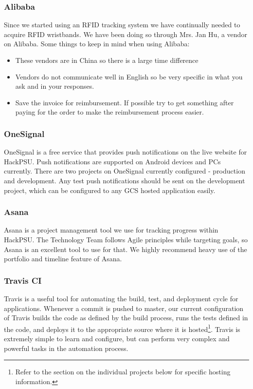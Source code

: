 \documentclass[twoside, 12pt]{article}
\newenvironment{tightitemize} %
{\begin{itemize}\itemsep1pt \parskip0pt \parsep0pt}
{\end{itemize}\vspace{-\topsep}}
\begin{document}
\subsubsection{Alibaba} \label{section:alibaba}
\par Since we started using an RFID tracking system we have continually needed to acquire RFID wristbands.  We have been doing so through Mrs. Jan Hu, a vendor on Alibaba.  Some things to keep in mind when using Alibaba:
\begin{tightitemize}
    \item These vendors are in China so there is a large time difference
    \item Vendors do not communicate well in English so be very specific in what you ask and in your responses.
    \item Save the invoice for reimbursement.  If possible try to get something after paying for the order to make the reimbursement process easier.
\end{tightitemize}

\subsubsection{OneSignal}
\par OneSignal is a free service that provides push notifications on the live website for HackPSU. Push notifications are supported on Android devices and PCs currently. There are two projects on OneSignal currently configured - production and development. Any test push notifications should be sent on the development project, which can be configured to any GCS hosted application easily.

\subsubsection{Asana}
\par Asana is a project management tool we use for tracking progress within HackPSU. The Technology Team follows Agile principles while targeting goals, so Asana is an excellent tool to use for that. We highly recommend heavy use of the portfolio and timeline feature of Asana.

\subsubsection{Travis CI} \label{section:travis}
\par Travis is a useful \cite{stamas_2017} tool for automating the build, test, and deployment cycle for applications. Whenever a commit is pushed to master, our current configuration of Travis builds the code as defined by the build process, runs the tests defined in the code, and deploys it to the appropriate source where it is hosted\footnote{Refer to the section on the individual projects below for specific hosting information.}. Travis is extremely simple \cite{dwyl} to learn and configure, but can perform very complex and powerful tasks in the automation process.
\end{document}
